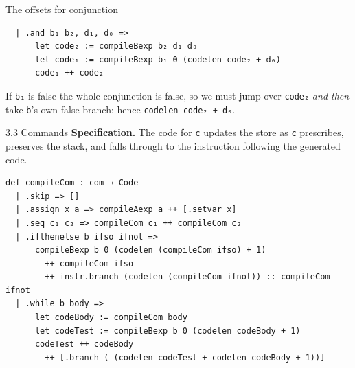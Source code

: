 \documentclass[aspectratio=169,10pt]{beamer}
\newcommand{\code}[1]{\texttt{\small #1}}
\begin{document}
\begin{frame}[fragile]{The offsets for conjunction}
\begin{lstlisting}
  | .and b₁ b₂, d₁, d₀ =>
      let code₂ := compileBexp b₂ d₁ d₀
      let code₁ := compileBexp b₁ 0 (codelen code₂ + d₀)
      code₁ ++ code₂
\end{lstlisting}
\begin{center}
\end{center}
\vspace{6mm}
If \code{b₁} is false the whole conjunction is false, so we must jump over
\code{code₂} \emph{and then} take \code{b}'s own false branch: hence
\code{codelen code₂ + d₀}.
\end{frame}

\begin{frame}[fragile]{3.3 Commands}
\textbf{Specification.}  The code for \code{c} updates the store as \code{c}
prescribes, preserves the stack, and falls through to the instruction
following the generated code.
\begin{lstlisting}
def compileCom : com → Code
  | .skip => []
  | .assign x a => compileAexp a ++ [.setvar x]
  | .seq c₁ c₂ => compileCom c₁ ++ compileCom c₂
  | .ifthenelse b ifso ifnot =>
      compileBexp b 0 (codelen (compileCom ifso) + 1)
        ++ compileCom ifso
        ++ instr.branch (codelen (compileCom ifnot)) :: compileCom ifnot
  | .while b body =>
      let codeBody := compileCom body
      let codeTest := compileBexp b 0 (codelen codeBody + 1)
      codeTest ++ codeBody
        ++ [.branch (-(codelen codeTest + codelen codeBody + 1))]
\end{lstlisting}
\end{frame}
\end{document}
